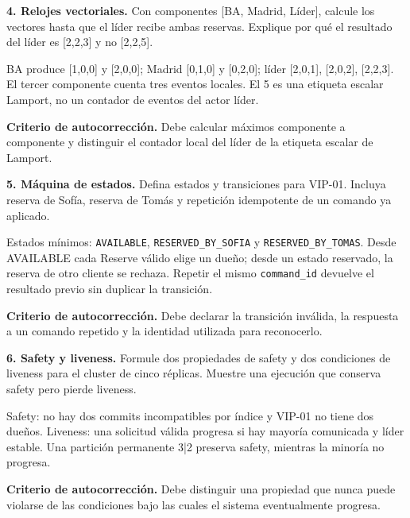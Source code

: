 \documentclass[variant=guiaresuelta,cover=institutional,mode=screen]{ua-engineering-v6-article}
\begin{document}
\begin{uaexercise}
\textbf{4. Relojes vectoriales.} Con componentes [BA, Madrid, Líder], calcule los vectores hasta que el líder recibe ambas reservas. Explique por qué el resultado del líder es [2,2,3] y no [2,2,5].
\end{uaexercise}
\begin{uaanswer}
BA produce [1,0,0] y [2,0,0]; Madrid [0,1,0] y [0,2,0]; líder [2,0,1], [2,0,2], [2,2,3]. El tercer componente cuenta tres eventos locales. El 5 es una etiqueta escalar Lamport, no un contador de eventos del actor líder.

\par\smallskip\textbf{Criterio de autocorrección.} Debe calcular máximos componente a componente y distinguir el contador local del líder de la etiqueta escalar de Lamport.
\end{uaanswer}

\begin{uaexercise}
\textbf{5. Máquina de estados.} Defina estados y transiciones para VIP-01. Incluya reserva de Sofía, reserva de Tomás y repetición idempotente de un comando ya aplicado.
\end{uaexercise}
\begin{uaanswer}
Estados mínimos: \texttt{AVAILABLE}, \texttt{RESERVED\_BY\_SOFIA} y \texttt{RESERVED\_BY\_TOMAS}. Desde AVAILABLE cada Reserve válido elige un dueño; desde un estado reservado, la reserva de otro cliente se rechaza. Repetir el mismo \texttt{command\_id} devuelve el resultado previo sin duplicar la transición.

\par\smallskip\textbf{Criterio de autocorrección.} Debe declarar la transición inválida, la respuesta a un comando repetido y la identidad utilizada para reconocerlo.
\end{uaanswer}

\begin{uaexercise}
\textbf{6. Safety y liveness.} Formule dos propiedades de safety y dos condiciones de liveness para el cluster de cinco réplicas. Muestre una ejecución que conserva safety pero pierde liveness.
\end{uaexercise}
\begin{uaanswer}
Safety: no hay dos commits incompatibles por índice y VIP-01 no tiene dos dueños. Liveness: una solicitud válida progresa si hay mayoría comunicada y líder estable. Una partición permanente 3|2 preserva safety, mientras la minoría no progresa.

\par\smallskip\textbf{Criterio de autocorrección.} Debe distinguir una propiedad que nunca puede violarse de las condiciones bajo las cuales el sistema eventualmente progresa.
\end{uaanswer}
\end{document}
